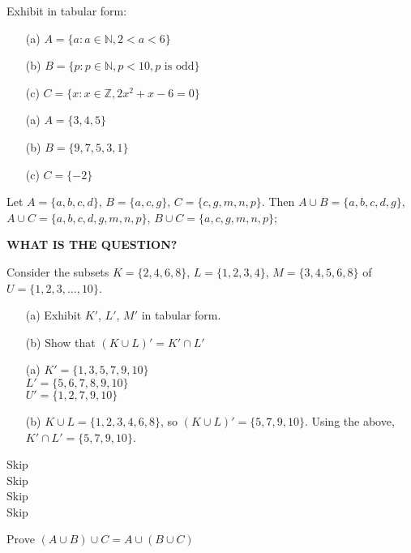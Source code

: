 \exercises

\exercise 
Exhibit in tabular form: 
\begin{itemize}
    \item[(a)] 
        $A = \{a : a \in \mathbb{N}, 2 < a < 6\}$
    \item[(b)] 
        $B = \{p : p \in \mathbb{N}, p < 10, p \text{ is odd}\}$
    \item[(c)] 
        $C = \{x : x \in \mathbb{Z}, 2x^2 + x - 6 = 0\}$
\end{itemize}

\answer
\begin{itemize}
    \item[(a)] 
        $A = \{3, 4, 5\}$
    \item[(b)] 
        $B = \{9, 7, 5, 3, 1\}$
    \item[(c)] 
        $C = \{-2\}$
\end{itemize}


\exercise 
Let $A = \{a,b,c,d\}$, $B = \{a,c,g\}$, $C = \{c,g,m,n,p\}$. Then $A \cup B = \{a,b,c,d,g\}$, $A \cup C = \{a,b,c,d,g,m,n,p\}$, $B \cup C = \{a,c,g,m,n,p\}$;

\answer 
\large\textbf{WHAT IS THE QUESTION?}\normalsize


\exercise 
Consider the subsets $K = \{2,4,6,8\}$, $L=\{1,2,3,4\}$, $M=\{3,4,5,6,8\}$ of $U = \{1,2,3,\ldots,10\}$.
\begin{itemize}
    \item[(a)]
        Exhibit $K'$, $L'$, $M'$ in tabular form.
    \item[(b)]
        Show that $(K \cup L)' = K' \cap L'$
\end{itemize}

\answer
\begin{itemize}
    \item[(a)]
        $K' = \{1,3,5,7,9,10\}$ \\
        $L' = \{5,6,7,8,9,10\}$ \\
        $U' = \{1,2,7,9,10\}$
    \item[(b)]
        $K \cup L = \{1,2,3,4,6,8\}$, so $(K \cup L)' = \{5,7,9,10\}$. Using the above, $K' \cap L' = \{5,7,9,10\}$.
\end{itemize}


\exercise Skip \\
\exercise Skip \\
\exercise Skip \\
\exercise Skip


\exercise 
Prove $(A \cup B) \cup C = A \cup (B \cup C)$

